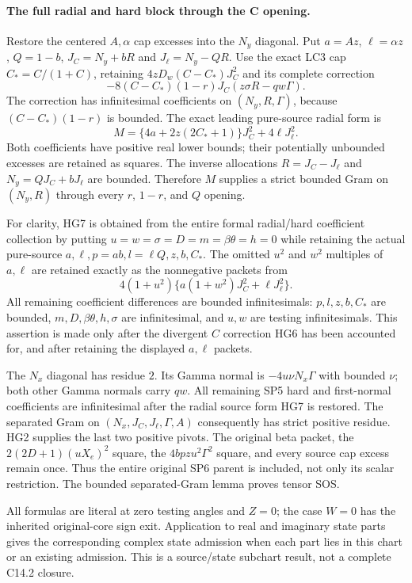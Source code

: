 \paragraph{The full radial and hard block through the C opening.}
Restore the centered $A,\alpha$ cap excesses into the $N_y$ diagonal.
Put $a=Az$, $\ell=\alpha z$, $Q=1-b$,
$J_C=N_y+bR$ and $J_\ell=N_y-QR$.
Use the exact LC3 cap $C_*=C/(1+C)$, retaining
$4zD_w(C-C_*)J_C^2$ and its complete correction
\[
 -8(C-C_*)(1-r)J_C(z\sigma R-qw\Gamma).
 \tag{HG6}
\]
The correction has infinitesimal coefficients on
$(N_y,R,\Gamma)$, because $(C-C_*)(1-r)$ is bounded.
The exact leading pure-source radial form is
\[
 M=\{4a+2z(2C_*+1)\}J_C^2+4\ell J_\ell^2.
 \tag{HG7}
\]
Both coefficients have positive real lower bounds; their potentially
unbounded excesses are retained as squares.  The inverse allocations
$R=J_C-J_\ell$ and $N_y=QJ_C+bJ_\ell$ are bounded.  Therefore
$M$ supplies a strict bounded Gram on $(N_y,R)$ through every
$r$, $1-r$, and $Q$ opening.

For clarity, HG7 is obtained from the entire formal radial/hard
coefficient collection by putting $u=w=\sigma=D=m=\beta\theta=h=0$
while retaining the actual pure-source $a,\ell,p=ab,l=\ell Q,z,b,C_*$.
The omitted $u^2$ and $w^2$ multiples of $a,\ell$ are retained
exactly as the nonnegative packets from
\[
 4(1+u^2)\{a(1+w^2)J_C^2+\ell J_\ell^2\}.
\]
All remaining coefficient differences are bounded infinitesimals:
$p,l,z,b,C_*$ are bounded, $m,D,\beta\theta,h,\sigma$ are
infinitesimal, and $u,w$ are testing infinitesimals.  This assertion
is made only after the divergent $C$ correction HG6 has been
accounted for, and after retaining the displayed $a,\ell$ packets.

The $N_x$ diagonal has residue $2$.  Its Gamma normal is
$-4u\nu N_x\Gamma$ with bounded $\nu$; both other Gamma normals
carry $qw$.  All remaining SP5 hard and first-normal coefficients
are infinitesimal after the radial source form HG7 is restored.
The separated Gram on $(N_x,J_C,J_\ell,\Gamma,A)$ consequently has
strict positive residue.  HG2 supplies the last two positive pivots.
The original beta packet, the $2(2D+1)(uX_e)^2$ square, the
$4bpzu^2\Gamma^2$ square, and every source cap excess remain once.
Thus the entire original SP6 parent is included, not only its scalar
restriction.  The bounded separated-Gram lemma proves tensor SOS.

All formulas are literal at zero testing angles and $Z=0$; the
case $W=0$ has the inherited original-core sign exit.  Application
to real and imaginary state parts gives the corresponding complex
state admission when each part lies in this chart or an existing
admission.  This is a source/state subchart result, not a complete
C14.2 closure.

